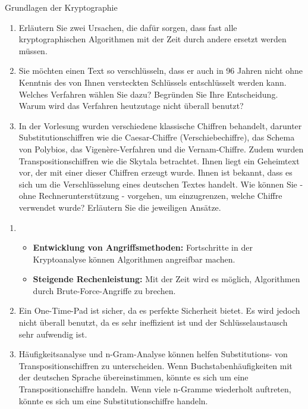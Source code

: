 \documentclass{article}
\begin{document}
\begin{exercise}{Grundlagen der Kryptographie}
  \begin{enumerate}
    \item Erläutern Sie zwei Ursachen, die dafür sorgen, dass fast alle kryptographischen Algorithmen mit der Zeit durch andere ersetzt werden müssen.
    \item Sie möchten einen Text so verschlüsseln, dass er auch in 96 Jahren nicht ohne Kenntnis des von Ihnen versteckten Schlüssels entschlüsselt werden kann. Welches Verfahren wählen Sie dazu? Begründen Sie Ihre Entscheidung. Warum wird das Verfahren heutzutage nicht überall benutzt?
    \item In der Vorlesung wurden verschiedene klassische Chiffren behandelt, darunter Substitutionschiffren wie die Caesar-Chiffre (Verschiebechiffre), das Schema von Polybios, das Vigenère-Verfahren und die Vernam-Chiffre. Zudem wurden Transpositionschiffren wie die Skytala betrachtet. Ihnen liegt ein Geheimtext vor, der mit einer dieser Chiffren erzeugt wurde. Ihnen ist bekannt, dass es sich um die Verschlüsselung eines deutschen Textes handelt. Wie können Sie - ohne Rechnerunterstützung - vorgehen, um einzugrenzen, welche Chiffre verwendet wurde? Erläutern Sie die jeweiligen Ansätze.
  \end{enumerate}
  
  \begin{solution}
    \begin{enumerate}
        \item \begin{itemize}
            \item \textbf{Entwicklung von Angriffsmethoden:} Fortschritte in der Kryptoanalyse können Algorithmen angreifbar machen.
            \item \textbf{Steigende Rechenleistung:} Mit der Zeit wird es möglich, Algorithmen durch Brute-Force-Angriffe zu brechen.
        \end{itemize}
        \item Ein One-Time-Pad ist sicher, da es perfekte Sicherheit bietet. Es wird jedoch nicht überall benutzt, da es sehr ineffizient ist und der Schlüsselaustausch sehr aufwendig ist.
        \item Häufigkeitsanalyse und n-Gram-Analyse können helfen Substitutions- von Transpositionschiffren zu unterscheiden. Wenn Buchstabenhäufigkeiten mit der deutschen Sprache übereinstimmen, könnte es sich um eine Transpositionschiffre handeln. Wenn viele n-Gramme wiederholt auftreten, könnte es sich um eine Substitutionschiffre handeln.
    \end{enumerate}
  \end{solution}
\end{exercise}
\end{document}
